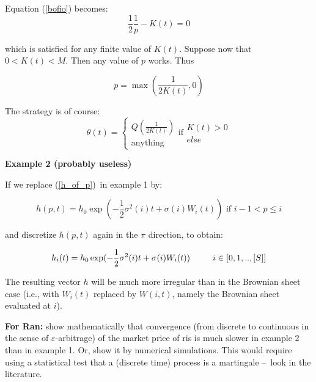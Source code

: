 \documentclass{article}
\begin{document}
Equation (\ref{bofio}) becomes:%
\begin{equation*}
\frac{1}{2}\frac{1}{p}-K(t)=0
\end{equation*}

which is satisfied for any finite value of $K(t)$. Suppose now that $0<K(t)<M
$. Then any value of $p$ works. Thus

\begin{equation*}
p=\max (\frac{1}{2K(t)},0)
\end{equation*}

The strategy is of course:%
\begin{equation*}
\theta (t)=\left\{ 
\begin{array}{c}
Q(\frac{1}{2K(t)}) \\ 
\text{anything}%
\end{array}%
\right. \text{if}%
\begin{array}{c}
K(t)>0 \\ 
else%
\end{array}%
\end{equation*}

\bigskip 

\textbf{Example 2 (probably useless)}

If we replace (\ref{h_of_p})\ in example 1 by:

\begin{equation*}
h(p,t)=h_{0}\exp (-\frac{1}{2}\sigma ^{2}(i)t+\sigma (i)W_{i}(t))\text{ if }%
i-1<p\leq i
\end{equation*}%
\bigskip

and discretize $h(p,t)$ again in the $\pi $ direction, to obtain:

\begin{equation*}
h_{i}(t)=h_{0}\exp (-\frac{1}{2}\sigma ^{2}(i)t+\sigma (i)W_{i}(t))\text{ \
\ \ \ \ }i\in \lbrack 0,1,..,[S]]
\end{equation*}%
\bigskip

The resulting vector $h$ will be much more irregular than in the Brownian
sheet case (i.e., with $W_{i}(t)$ replaced by $W(i,t)$, namely the Brownian
sheet evaluated at $i$).

\bigskip

\textbf{For Ran:} show mathematically that convergence (from discrete to
continuous in the sense of $\varepsilon $-arbitrage) of the market price of
ris is much slower in example 2 than in example 1. Or, show it by numerical
simulations. This would require using a statistical test that a (discrete
time) process is a martingale --\TEXTsymbol{>}\ look in the literature.
\end{document}
